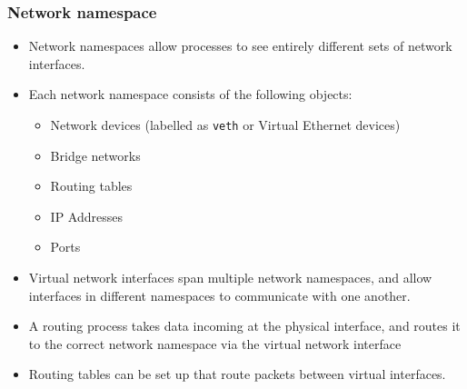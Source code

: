 \documentclass{article}
\begin{document}
\subsubsection{Network namespace}
\begin{itemize}
    \item Network namespaces allow processes to see entirely different sets of network interfaces. 
    
    \item Each network namespace consists of the following objects:
    \begin{itemize}
        \item Network devices (labelled as \texttt{veth} or Virtual Ethernet devices)
        
        \item Bridge networks
        
        \item Routing tables 
        
        \item IP Addresses 
        
        \item Ports
    \end{itemize}
    
    \item Virtual network interfaces span multiple network namespaces, and allow interfaces in different namespaces to communicate with one another. 
    
    \item A routing process takes data incoming at the physical interface, and routes it to the correct network namespace via the virtual network interface
    
    \item Routing tables can be set up that route packets between virtual interfaces.
\end{itemize}
\end{document}
